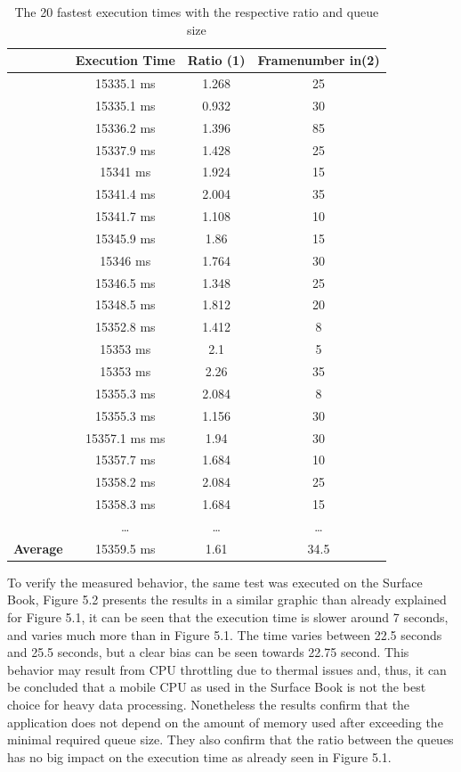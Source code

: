 \begin{table}[!]
\centering
	\begin{tabular}{l|c|c|c}
	  \hline
	  	&\textbf{Execution Time} & \textbf{Ratio (1)} & \textbf{Framenumber in(2)}\\\hline 
	  	& 15335.1 ms & 1.268 & 25\\
		& 15335.1 ms & 0.932 & 30\\
		& 15336.2 ms & 1.396 & 85\\
		& 15337.9 ms & 1.428 & 25\\
		& 15341 ms  & 1.924 & 15\\
		& 15341.4  ms & 2.004 & 35\\
		& 15341.7  ms & 1.108 & 10\\
		& 15345.9  ms & 1.86 & 15\\
		& 15346 ms & 1.764 & 30\\
		& 15346.5  ms& 1.348 & 25\\
		& 15348.5  ms& 1.812 & 20\\
		& 15352.8  ms& 1.412 & 8\\
		& 15353 ms  & 2.1	 & 5\\
		& 15353 ms  & 2.26 & 35\\
		& 15355.3 ms & 2.084 & 8\\
		& 15355.3 ms & 1.156 & 30\\
		& 15357.1 ms  ms& 1.94 & 30\\
		& 15357.7 ms & 1.684 & 10\\
		& 15358.2 ms & 2.084 & 25\\
		& 15358.3 ms & 1.684 & 15\\
		& \dots & \dots & \dots\\\hline
	  	\textbf{Average} & 15359.5 ms& 1.61 & 34.5\\ 
	  \hline
	\end{tabular}
	\caption{The 20 fastest execution times with the respective ratio and queue size}
\end{table}

To verify the measured behavior, the same test was executed on the Surface Book, Figure 5.2 presents the results in a similar graphic than already explained for Figure 5.1, it can be seen that the execution time is slower around 7 seconds, and varies much more than in Figure 5.1. The time varies between 22.5 seconds and 25.5 seconds, but a clear bias can be seen towards 22.75 second. This behavior may result from CPU throttling due to thermal issues and, thus, it can be concluded that a mobile CPU as used in the Surface Book is not the best choice for heavy data processing. Nonetheless the results confirm that the application does not depend on the amount of memory used after exceeding the minimal required queue size. They also confirm that the ratio between the queues has no big impact on the execution time as already seen in Figure 5.1. 
\vspace{1em}

